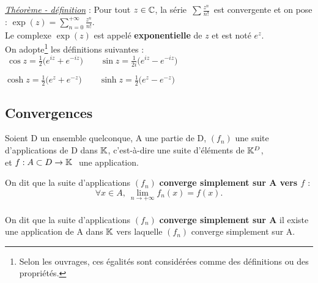 \vspace{1.5cm}

\noindent\underline{\emph{Théorème - définition}} : Pour tout \(z\in \mathbb{C}\), la série \(\,\displaystyle\sum \frac{z^n}{n!}\,\) est convergente et on pose : \(\displaystyle \exp(z)=\sum_{n=0}^{+\infty} \frac{z^n}{n!}. \)\\
Le complexe \(\exp(z)\) est appelé \textbf{exponentielle} de \(z\) et est noté \(e^z\).\vspace{0.5cm}\\
On adopte\footnote{Selon les ouvrages, ces égalités sont considérées comme des définitions ou des propriétés.} les définitions suivantes : \(\ \displaystyle \cos z = \frac{1}{2}\bigl(e^{iz}+e^{-iz}\bigr) \qquad \sin z = \frac{1}{2i}\bigl(e^{iz}-e^{-iz}\bigr) \)

\vspace{0.4cm}

\hspace{6.25cm}\( \displaystyle \cosh z = \frac{1}{2}\bigl(e^{z}+e^{-z}\bigr) \qquad \sinh z = \frac{1}{2}\bigl(e^{z}-e^{-z}\bigr) \)

\newpage

\subsection{Convergences}

\vspace{0.7cm}

\begin{center}
    Soient D un ensemble quelconque, A une partie de D, \((f_n)\) une suite\\
    d'applications de D dans \(\mathbb{K}\), c'est-à-dire une suite d'éléments de \(\mathbb{K}^D\), \\et \(f:A\subset D\to \mathbb{K} \ \) une application.
\end{center}

\vspace{1cm}

\noindent On dit que la suite d'applications \((f_n)\) \textbf{converge simplement sur A vers \(f\)} \ssi :\vspace{-0.2cm} \[ \forall x\in A,\ \lim_{n\to +\infty}f_n(x)=f(x). \]\\
On dit que la suite d'applications \((f_n)\) \textbf{converge simplement sur A} \ssi il existe une application de A dans \(\mathbb{K}\) vers laquelle \((f_n)\) converge simplement sur A.


